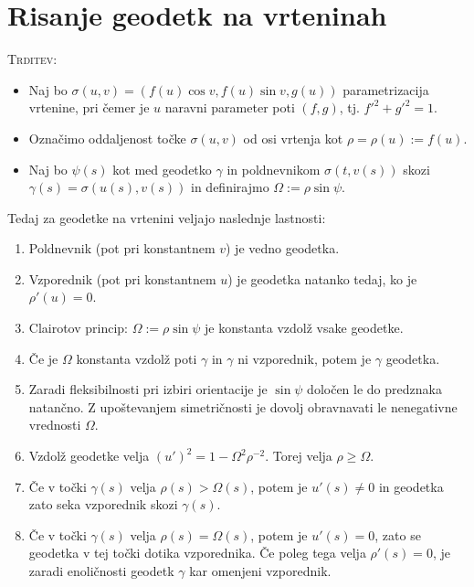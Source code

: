 \documentclass[8pt,a4paper]{amsart}
\theoremstyle{definition} %
\theoremstyle{plain} %
\begin{document}
\section*{\textbf{Risanje geodetk na vrteninah}} %

\textsc{Trditev: }
\begin{itemize}

\item Naj bo $\sigma (u,v) = (f(u)\cos v, f(u) \sin v, g(u))$ parametrizacija vrtenine, pri čemer je $u$ naravni parameter poti $(f,g)$, tj. $f'^2+g'^2=1$.

\item Označimo oddaljenost točke $\sigma (u,v)$ od osi vrtenja kot $\rho = \rho (u) := f(u).$

\item Naj bo $\psi (s)$ kot med geodetko $\gamma$ in poldnevnikom $\sigma (t,v(s))$ skozi $\gamma (s) = \sigma (u(s),v(s))$ in definirajmo $\Omega := \rho \sin \psi.$
\end{itemize}

Tedaj za geodetke na vrtenini veljajo naslednje lastnosti:

\begin{enumerate}

\item Poldnevnik (pot pri konstantnem $v$) je vedno geodetka.

\item Vzporednik (pot pri konstantnem $u$) je geodetka natanko tedaj, ko je $\rho'(u) = 0$.

\item Clairotov princip: $\Omega := \rho \sin \psi$ je konstanta vzdolž vsake geodetke.

\item Če je $\Omega$ konstanta vzdolž poti $\gamma$ in $\gamma$ ni vzporednik, potem je $\gamma$ geodetka.

\item Zaradi fleksibilnosti pri izbiri orientacije je $\sin \psi$ določen le do predznaka natančno. Z upoštevanjem simetričnosti je dovolj obravnavati le nenegativne vrednosti $\Omega$.

\item Vzdolž geodetke velja $(u')^2 = 1-\Omega^2 \rho^{-2}$. Torej velja $\rho \geq \Omega$.

\item Če v točki $\gamma (s)$ velja $\rho (s) > \Omega (s)$, potem je $u'(s) \neq 0$ in geodetka zato seka vzporednik skozi $\gamma (s)$.

\item Če v točki $\gamma (s)$ velja $\rho (s) = \Omega (s)$, potem je $u'(s) = 0$, zato se geodetka v tej točki dotika vzporednika. Če poleg tega velja $\rho'(s) = 0$, je zaradi enoličnosti geodetk $\gamma$ kar omenjeni vzporednik.

\end{enumerate}
\end{document}
